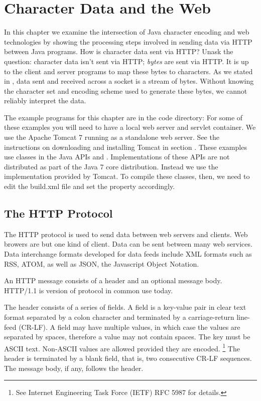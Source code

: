\chapter{Character Data and the Web}\label{chapter:web}

In this chapter we examine the intersection of Java character encoding 
and web technologies by showing the processing steps involved 
in sending data via HTTP between Java programs.
How is character data sent via HTTP?
Unask the question: character data isn't sent via HTTP; \emph{bytes} are sent via HTTP.
It is up to the client and server programs to map these bytes to characters.
As we stated in ,
data sent and received across a socket is a stream of bytes.
Without knowing the character set and encoding scheme used to generate
these bytes, we cannot reliably interpret the data.

The example programs for this chapter are in the code directory:
%
%
For some of these examples you will need to have a local web server and servlet container.
We use the Apache Tomcat 7 running as a standalone web server.
See the instructions on downloading and installing Tomcat in section .
These examples use classes in the Java APIs  and .
Implementations of these APIs are not distributed as part of the Java 7 core distribution.
Instead we use the implementation provided by Tomcat.
To compile these classes, then, we need to edit the build.xml file and set the
property  accordingly.

\section{The HTTP Protocol}

The HTTP protocol is used to send data between web servers and clients.
Web browers are but one kind of client.
Data can be sent between many web services.
Data interchange formats developed for data feeds include XML formats such as
RSS, ATOM, as well as JSON, the Javascript Object Notation.

An HTTP message consists of a header and an optional message body.
HTTP/1.1 is version of protocol in common use today.

The header consists of a series of fields.
A field is a key-value pair in clear text format separated by a colon character
and terminated by a carriage-return line-feed (CR-LF).
A field may have multiple values, in which case the values are separated by spaces,
therefore a value may not contain spaces.
The key must be ASCII text.
Non-ASCII values are allowed provided they are encoded.%
%
\footnote{See Internet Engineering Task Force (IETF) RFC 5987 for details.}
%
The header is terminated by a blank field, that is, two consecutive CR-LF sequences.
The message body, if any, follows the header.

